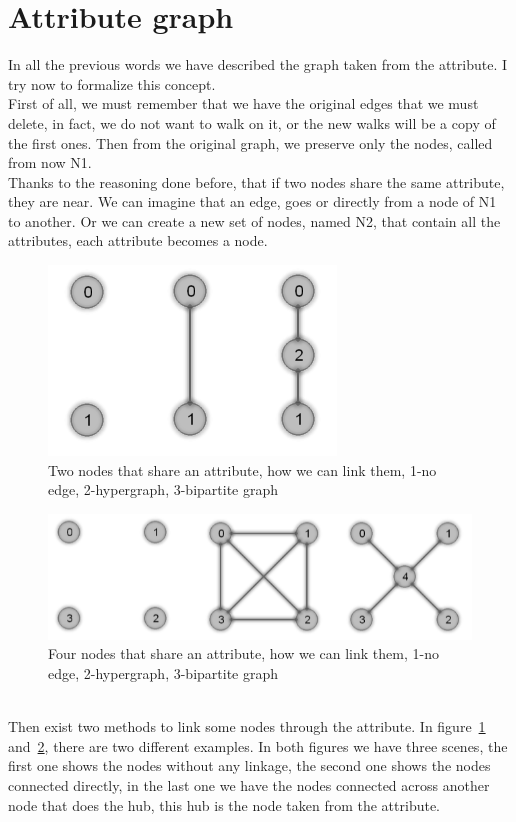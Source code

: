 \documentclass[epsfig,a4paper,11pt,titlepage,twoside,openany]{book}
\begin{document}
\section{Attribute graph}
In all the previous words we have described the graph taken from the attribute. I try now to formalize this concept.\\
First of all, we must remember that we have the original edges that we must delete, in fact, we do not want to walk on it, or the new walks will be a copy of the first ones. Then from the original graph, we preserve only the nodes, called from now N1.\\
Thanks to the reasoning done before, that if two nodes share the same attribute, they are near. We can imagine that an edge, goes or directly from a node of N1 to another. Or we can create a new set of nodes, named N2, that contain all the attributes, each attribute becomes a node.
%
\begin{figure}[htp]
	\centering
	\includegraphics{images/add_att2}
	\caption{Two nodes that share an attribute, how we can link them, 1-no edge, 2-hypergraph, 3-bipartite graph}
	\label{fig:add_att2}
\end{figure}
\begin{figure}[htp]
	\centering
	\includegraphics[width=\linewidth]{images/add_att4}
	\caption{Four nodes that share an attribute, how we can link them, 1-no edge, 2-hypergraph, 3-bipartite graph}
	\label{fig:add_att4}
\end{figure}
\\
Then exist two methods to link some nodes through the attribute. In figure~\ref{fig:add_att2} and~\ref{fig:add_att4}, there are two different examples. In both figures we have three scenes, the first one shows the nodes without any linkage, the second one shows the nodes connected directly, in the last one we have the nodes connected across another node that does the hub, this hub is the node taken from the attribute.
\end{document}

